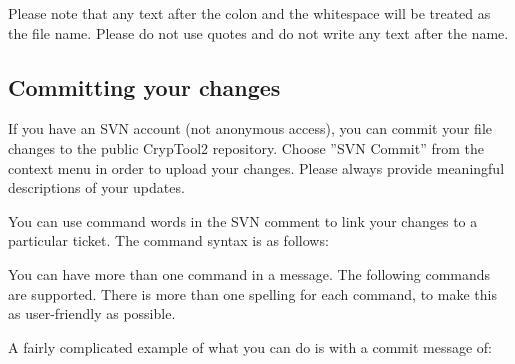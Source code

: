 \begin{center}
\end{center}

Please note that any text after the colon and the whitespace will be treated as the file name. Please do not use quotes and do not write any text after the name. 


\subsection*{Committing your changes}
\label{CommitingChanges}

If you have an SVN account (not anonymous access), you can commit your file changes to the public CrypTool2 repository. Choose ''SVN Commit'' from the context menu in order to upload your changes. Please always provide meaningful descriptions of your updates.

You can use command words in the SVN comment to link your changes to a particular ticket. The command syntax is as follows:

\begin{center}
\end{center}


You can have more than one command in a message. The following commands are supported. There is more than one spelling for each command, to make this as user-friendly as possible.

\begin{center}
\end{center}

A fairly complicated example of what you can do is with a commit message of:

